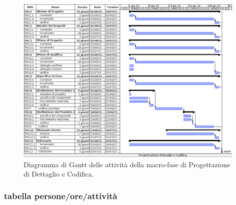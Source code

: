 \begin{figure}[h]
\begin{center}
\includegraphics[width=\textwidth, height=\textheight, keepaspectratio]{img/progdet-gantt.png}
\caption{Diagramma di Gantt delle attività della macro-fase di Progettazione di Dettaglio e Codifica.}
\end{center}
\end{figure}
\clearpage

\newpage
\subsubsection{tabella persone/ore/attività}

